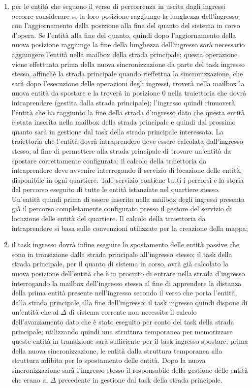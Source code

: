 \begin{enumerate}
\item per le entità che seguono il verso di percorrenza in uscita dagli ingressi occorre considerare se la loro posizione raggiunge la lunghezza dell'ingresso con l'aggiornamento della posizione alla fine del quanto del sistema in corso d'opera. Se l'entità alla fine del quanto, quindi dopo l'aggiornamento della nuova posizione raggiunge la fine della lunghezza dell'ingresso sarà necessario aggiungere l'entità nella mailbox della strada principale; questa operazione viene effettuata prima della nuova sincronizzazione da parte del task ingresso stesso, affinchè la strada principale quando rieffettua la sincronizzazione, che sarà dopo l'esecuzione delle operazioni degli ingressi, troverà nella mailbox la nuova entità da spostare e la troverà in posizione 0 nella traiettoria che dovrà intraprendere (gestita dalla strada principale); l'ingresso quindi rimuoverà l'entità che ha raggiunto la fine della strada d'ingresso dato che questa entità è stata inserita nella mailbox della strada principale e quindi dal prossimo quanto sarà in gestione dal task della strada principale interessata. La traiettoria che l'entità dovrà intraprendere deve essere calcolata dall'ingresso stesso, al fine di permettere alla strada principale di trovare un'entità da spostare correttamente configurata; il calcolo della traiettoria da intraprendere deve avvenire interrogando il servizio di locazione delle entità, disponibile in ogni quartiere. Tale servizio contiene tutti i percorsi e la storia del percorso eseguito di tutte le entità istanziate nel quartiere stesso. Un'entità quindi prima di essere inserita nella mailbox degli ingressi presenta già il percorso completamente configurato presso il gestore del servizio di locazione delle entità del quartiere. Il calcolo della traiettoria da intraprendere si basa sulle convenzioni utilizzate per la creazione della mappa;
\item il task ingresso dovrà infine eseguire lo spostamento delle entità passive che sono in transizione dalla strada principale all'ingresso stesso; il task della strada principale, per il quanto di sistema in corso, avrà già calcolato la nuova posizione dell'entità che è in procinto di entrare nella strada d'ingresso interrogando la mailbox dell'ingresso stesso al fine di apprendere la distanza della prima entità presente nell'ingresso secondo il verso che porta l'entità, dalla strada principale alla fine dell'ingresso; il task ingresso quindi dispone di un'entità che al $\Delta$ di sistema corrente non necessita il calcolo dell'avanzamento dato che è stato eseguito per conto del task della strada principale; utilizzando quindi una struttura temporanea per memorizzare queste entità in transizione sarà sufficiente per il task ingresso spostare, prima della nuova sincronizzazione, le entità dalla struttura temporanea alla struttura adibita per lo spostamento delle entità. Dopo la nuova sincronizzazione sarà l'ingresso stesso il responsabile della gestione delle entità che erano al $\Delta$ precedente in gestione dal task della strada principale.
\end{enumerate}
